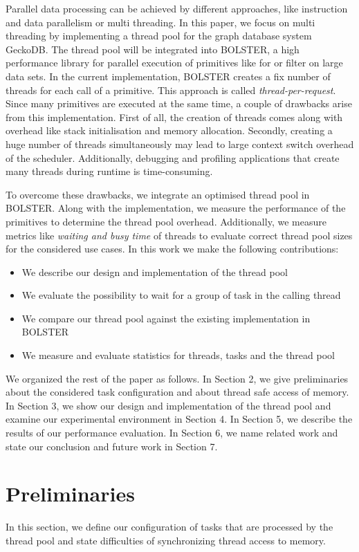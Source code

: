 \documentclass[conference]{IEEEtran}
\begin{document}
Parallel data processing can be achieved by different approaches, like instruction and data parallelism or multi threading. In this paper, we focus on multi threading by implementing a thread pool for the graph database system GeckoDB. The thread pool will be integrated into BOLSTER, a high performance library for parallel execution of primitives like for or filter on large data sets. In the current implementation, BOLSTER creates a fix number of threads for each call of a primitive. This approach is called \emph{thread-per-request}. Since many primitives are executed at the same time, a couple of drawbacks arise from this implementation.
First of all, the creation of threads comes along with overhead like stack initialisation and memory allocation. Secondly, creating a huge number of threads simultaneously may lead to large context switch overhead of the scheduler. Additionally, debugging and profiling applications that create many threads during runtime is 	time-consuming.

To overcome these drawbacks, we integrate an optimised thread pool in BOLSTER. Along with the implementation, we measure the performance of the primitives to determine the thread pool overhead. Additionally, we measure metrics like \emph{waiting and busy time} of threads to evaluate correct thread pool sizes for the considered use cases. In this work we make the following contributions:
\begin{itemize}
	\item We describe our design and implementation of the thread pool
	\item We evaluate the possibility to wait for a group of task in the calling thread
	\item We compare our thread pool against the existing implementation in BOLSTER
	\item We measure and evaluate statistics for threads, tasks and the thread pool
\end{itemize}
We organized the rest of the paper as follows. In Section 2, we give preliminaries about the considered task configuration and about thread safe access of memory. In Section 3, we show our design and implementation of the thread pool and examine our experimental environment in Section 4. In Section 5, we describe the results of our performance evaluation. In Section 6, we name related work and state our conclusion and future work in Section 7.

\section{Preliminaries}
In this section, we define our configuration of tasks that are processed by the thread pool and state difficulties of synchronizing thread access to memory.
\end{document}
